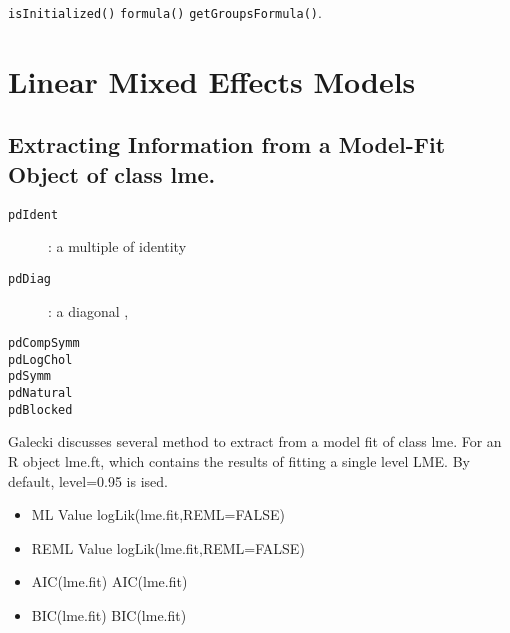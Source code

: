 \texttt{isInitialized()}
\texttt{formula()}
\texttt{getGroupsFormula()}.
\section{Linear Mixed Effects Models}
\subsection{Extracting Information from a Model-Fit Object of class lme.}


\begin{description}
\item[\texttt{pdIdent}]: a multiple of identity
\item[\texttt{pdDiag}]:  a diagonal ,

\item[\texttt{pdCompSymm}]
\item[\texttt{pdLogChol}]
\item[\texttt{pdSymm}]
\item[\texttt{pdNatural}]
\item[\texttt{pdBlocked}]
\end{description}








Galecki discusses several method to extract from a model fit of class lme.
For an R object lme.ft, which contains the results of fitting a single level LME.
By default, level=0.95 is ised.
\begin{itemize}
\item ML Value logLik(lme.fit,REML=FALSE)
\item REML Value logLik(lme.fit,REML=FALSE)
\item AIC(lme.fit) AIC(lme.fit)
\item BIC(lme.fit) BIC(lme.fit)
\end{itemize}

